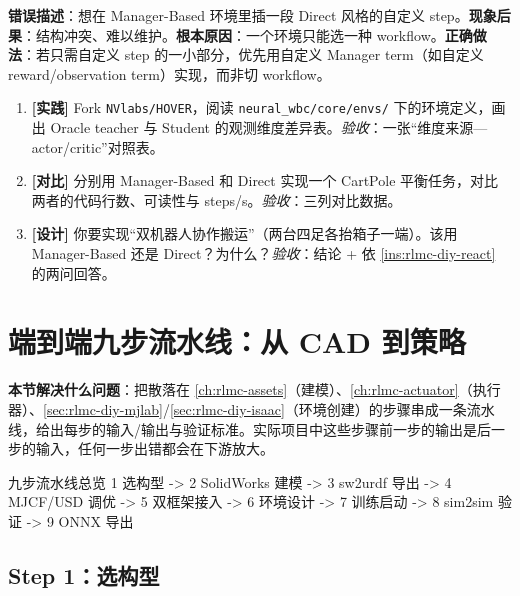 \begin{pitfall}
\textbf{错误描述}：想在 Manager-Based 环境里插一段 Direct 风格的自定义 step。\textbf{现象后果}：结构冲突、难以维护。\textbf{根本原因}：一个环境只能选一种 workflow。\textbf{正确做法}：若只需自定义 step 的一小部分，优先用自定义 Manager term（如自定义 reward/observation term）实现，而非切 workflow。
\end{pitfall}

\begin{practice}
\begin{enumerate}
\item \textbf{[实践]} Fork \verb|NVlabs/HOVER|，阅读 \verb|neural_wbc/core/envs/| 下的环境定义，画出 Oracle teacher 与 Student 的观测维度差异表。\emph{验收}：一张“维度来源—actor/critic”对照表。
\item \textbf{[对比]} 分别用 Manager-Based 和 Direct 实现一个 CartPole 平衡任务，对比两者的代码行数、可读性与 steps/s。\emph{验收}：三列对比数据。
\item \textbf{[设计]} 你要实现“双机器人协作搬运”（两台四足各抬箱子一端）。该用 Manager-Based 还是 Direct？为什么？\emph{验收}：结论 + 依 \cref{ins:rlmc-diy-react} 的两问回答。
\end{enumerate}
\end{practice}

\section{端到端九步流水线：从 CAD 到策略}
\label{sec:rlmc-diy-pipeline}

\textbf{本节解决什么问题}：把散落在 \cref{ch:rlmc-assets}（建模）、\cref{ch:rlmc-actuator}（执行器）、\cref{sec:rlmc-diy-mjlab}/\cref{sec:rlmc-diy-isaac}（环境创建）的步骤串成一条流水线，给出每步的输入/输出与验证标准。实际项目中这些步骤前一步的输出是后一步的输入，任何一步出错都会在下游放大。

\begin{codebox}[text]{九步流水线总览}
1 选构型 -> 2 SolidWorks 建模 -> 3 sw2urdf 导出 -> 4 MJCF/USD 调优
        -> 5 双框架接入 -> 6 环境设计 -> 7 训练启动 -> 8 sim2sim 验证 -> 9 ONNX 导出
\end{codebox}

\subsection{Step 1：选构型}
\label{sec:rlmc-diy-pipe-morph}

